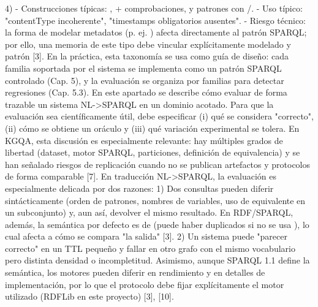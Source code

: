 {}4)  - Construcciones típicas: ,  + comprobaciones, y patrones con /. - Uso típico: "contentType incoherente", "timestamps obligatorios ausentes". - Riesgo técnico: la forma de modelar metadatos (p. ej. ) afecta directamente al patrón SPARQL; por ello, una memoria de este tipo debe vincular explícitamente modelado y patrón [3].\markdownRendererInterblockSeparator
{}En la práctica, esta taxonomía se usa como guía de diseño: cada familia soportada por el sistema se implementa como un patrón SPARQL controlado (Cap. 5), y la evaluación se organiza por familias para detectar regresiones (Cap. 5.3).\markdownRendererInterblockSeparator
{}\markdownRendererInterblockSeparator
{}En este apartado se describe cómo evaluar de forma trazable un sistema NL->SPARQL en un dominio acotado. Para que la evaluación sea científicamente útil, debe especificar (i) qué se considera "correcto", (ii) cómo se obtiene un oráculo y (iii) qué variación experimental se tolera. En KGQA, esta discusión es especialmente relevante: hay múltiples grados de libertad (dataset, motor SPARQL, particiones, definición de equivalencia) y se han señalado riesgos de replicación cuando no se publican artefactos y protocolos de forma comparable [7].\markdownRendererInterblockSeparator
{}En traducción NL->SPARQL, la evaluación es especialmente delicada por dos razones:\markdownRendererInterblockSeparator
{}1)  Dos consultas pueden diferir sintácticamente (orden de patrones, nombres de variables, uso de  equivalente en un subconjunto) y, aun así, devolver el mismo resultado. En RDF/SPARQL, además, la semántica por defecto es de  (puede haber duplicados si no se usa ), lo cual afecta a cómo se compara "la salida" [3]. 2)  Un sistema puede "parecer correcto" en un TTL pequeño y fallar en otro grafo con el mismo vocabulario pero distinta densidad o incompletitud. Asimismo, aunque SPARQL 1.1 define la semántica, los motores pueden diferir en rendimiento y en detalles de implementación, por lo que el protocolo debe fijar explícitamente el motor utilizado (RDFLib en este proyecto) [3], [10].\markdownRendererInterblockSeparator
